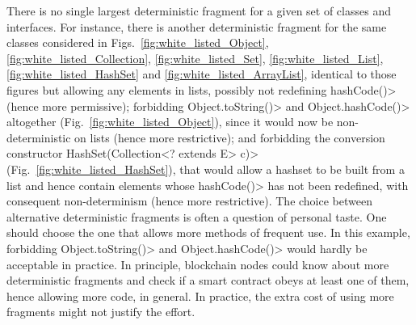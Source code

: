 There is no single largest deterministic fragment
for a given set of classes and interfaces. For instance, 
there is another deterministic fragment for the same classes considered in
Figs.~\ref{fig:white_listed_Object}, \ref{fig:white_listed_Collection},
\ref{fig:white_listed_Set}, \ref{fig:white_listed_List},
\ref{fig:white_listed_HashSet} and \ref{fig:white_listed_ArrayList}, identical
to those figures but allowing any elements in lists, possibly not redefining
\<hashCode()> (hence more permissive);
forbidding \<Object.toString()> and \<Object.hashCode()> altogether
(Fig.~\ref{fig:white_listed_Object}),
since it would now be non-deterministic on lists (hence
more restrictive); and forbidding the conversion constructor
\<HashSet(Collection$\text{<}$? extends E$\text{>}$ c)>
(Fig.~\ref{fig:white_listed_HashSet}), that would allow a hashset to be
built from a list and hence contain elements whose \<hashCode()> has not been redefined,
with consequent non-determinism (hence more restrictive). The choice between alternative
deterministic fragments is often a question of personal taste.
One should choose the one that allows more methods of frequent use. In this example,
forbidding \<Object.toString()> and \<Object.hashCode()> would hardly be acceptable in practice.
In principle, blockchain nodes could know about more deterministic fragments and check
if a smart contract obeys at least one of them, hence allowing more code, in general.
In practice, the extra cost of using more fragments might not justify the effort.
